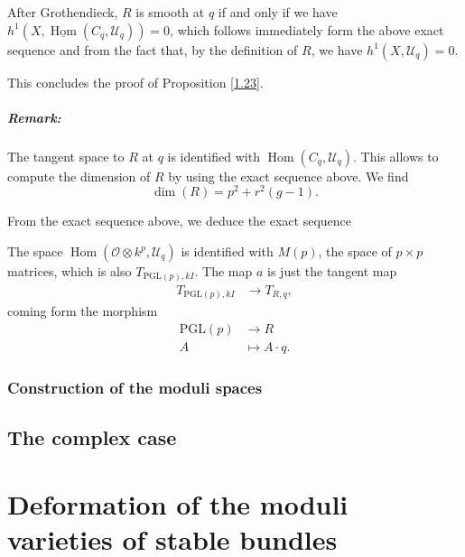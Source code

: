 \documentclass[12pt,a4paper]{book}
\DeclareMathOperator\Hom{Hom}
\DeclareMathOperator\End{End}
\def\OO{\mathscr{O}}
\def\UU{\mathscr{U}}
\def\PGL{\mathrm{PGL}}
\theoremstyle{definition} \newtheorem{defn}[thm]{Definition}
\theoremstyle{definition} \newtheorem{ejs}[thm]{Examples}
\theoremstyle{definition} \newtheorem{ej}[thm]{Example}
\begin{document}
     After Grothendieck, $R$ is smooth at $q$ if and only if we have $h^1(X,\underline{\Hom}(C_q,\UU_q))=0$, which follows immediately form the above exact sequence and from the fact that, by the definition of $R$, we have $h^1(X,\UU_q)=0$.

     This concludes the proof of Proposition \ref{1.23}. \\

     \paragraph{Remark:} The tangent space to $R$ at $q$ is identified with $\Hom(C_q,\UU_q)$. This allows to compute the dimension of $R$ by using the exact sequence above. We find
     \begin{equation*}
       \dim(R) = p^2 + r^2(g-1).
     \end{equation*}

     From the exact sequence above, we deduce the exact sequence
     \begin{center}
     \end{center}
     The space $\Hom(\OO\otimes k^p,\UU_q)$ is identified with $M(p)$, the space of $p\times p$ matrices, which is also $T_{\PGL(p),kI}$. The map $a$ is just the tangent map
     \begin{align*}
       T_{\PGL(p),kI}&\longrightarrow T_{R,q}, 
       \end{align*}
       coming form the morphism
       \begin{align*}
	  \PGL(p) &\longrightarrow R\\ 
	   A &\longmapsto A\cdot q. 
	 \end{align*}

	 \subsection{Construction of the moduli spaces}

	 \section{The complex case}\label{section 1IV}

	 \chapter{Deformation of the moduli varieties of stable bundles}


      \nocite{*}
		     

\end{document}
